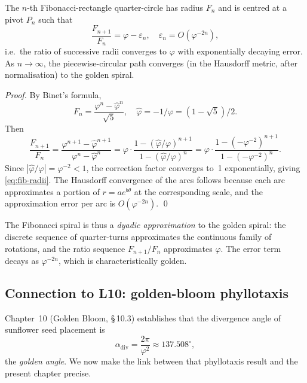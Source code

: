 \begin{proposition}
\label{prop:fib-converge}
The \(n\)-th Fibonacci-rectangle quarter-circle has radius
\(F_n\) and is centred at a pivot \(P_n\) such that
\begin{equation}\label{eq:fib-radii}
  \frac{F_{n+1}}{F_n} = \varphi - \varepsilon_n,
  \quad \varepsilon_n = O(\varphi^{-2n}),
\end{equation}
i.e.\ the ratio of successive radii converges to \(\varphi\)
with exponentially decaying error.  As \(n\to\infty\), the
piecewise-circular path converges (in the Hausdorff metric,
after normalisation) to the golden spiral.
\end{proposition}

\begin{proof}
By Binet's formula,
\[
  F_n = \frac{\varphi^n - \hat\varphi^n}{\sqrt{5}},
  \quad \hat\varphi = -1/\varphi = (1-\sqrt5)/2.
\]
Then
\[
  \frac{F_{n+1}}{F_n}
  = \frac{\varphi^{n+1}-\hat\varphi^{n+1}}{\varphi^n-\hat\varphi^n}
  = \varphi\cdot\frac{1 - (\hat\varphi/\varphi)^{n+1}}
                    {1 - (\hat\varphi/\varphi)^n}
  = \varphi\cdot\frac{1 - (-\varphi^{-2})^{n+1}}{1-(-\varphi^{-2})^n}.
\]
Since \(|\hat\varphi/\varphi| = \varphi^{-2} < 1\), the
correction factor converges to~1 exponentially, giving
\eqref{eq:fib-radii}.  The Hausdorff convergence of the arcs
follows because each arc approximates a portion of
\(r = ae^{b\theta}\) at the corresponding scale, and the
approximation error per arc is \(O(\varphi^{-2n})\).
\qed
\end{proof}

\begin{remark}
The Fibonacci spiral is thus a \emph{dyadic approximation} to the
golden spiral: the discrete sequence of quarter-turns approximates
the continuous family of rotations, and the ratio sequence
\(F_{n+1}/F_n\) approximates \(\varphi\).  The error term decays
as \(\varphi^{-2n}\), which is characteristically golden.
\end{remark}

\subsection{Connection to L10: golden-bloom phyllotaxis}
\label{subsec:17-L10-link}

Chapter~10 (Golden Bloom, \S\,10.3) establishes that the divergence
angle of sunflower seed placement is
\[
  \alpha_{\text{div}} = \frac{2\pi}{\varphi^2} \approx 137.508^\circ,
\]
the \emph{golden angle}.  We now make the link between that
phyllotaxis result and the present chapter precise.


